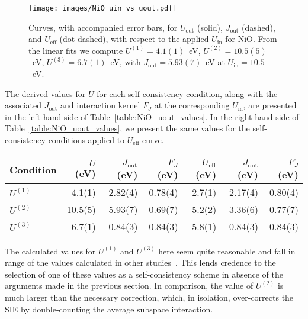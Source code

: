 %
\begin{figure}[th!]
\centering
\texttt{[image: images/NiO\_uin\_vs\_uout.pdf]}
\caption[Profiles of  $U_\textrm{out}$, $J_\textrm{out}$,  $U_\textrm{eff}$ vs $U_\textrm{in}$ for NiO]
{Curves, with accompanied error bars, 
for $U_\textrm{out}$ (solid), 
$J_\textrm{out}$ (dashed), 
and $U_\textrm{eff}$ (dot-dashed), 
with respect to the applied $U_\textrm{in}$ for NiO. 
%
From the linear fits we compute 
$U^{(1)}=4.1(1)$~eV, 
$U^{(2)}=10.5(5)$~eV, 
$U^{(3)}=6.7(1)$~eV, 
with $J_\textrm{out}=5.93(7)$~eV 
at $U_\textrm{in}=10.5$~eV.}
\label{fig:NiO_uin_vs_uout}
\end{figure}
%

%
The derived values for $U$ 
for each self-consistency condition, 
along with the associated $J_\textrm{out}$ 
and interaction kernel $F_J$ 
at the corresponding $U_\textrm{in}$, 
are presented in the left hand side of 
Table~\ref{table:NiO_uout_values}.
%
In the right hand side of Table~\ref{table:NiO_uout_values}, 
we present the same values for 
the self-consistency conditions 
applied to $U_\textrm{eff}$ curve.

\begin{table*}[th!]
\centering
\begin{tabular}{lrrr|rrr}
\hline\hline
Condition	&$U$ (eV)	&$J_\textrm{out}$ (eV)&$F_J$ (eV)&$U_\textrm{eff}$ (eV)&$J_\textrm{out}$ (eV)&$F_J$ (eV)\\	
\hline
$U^{(1)}$	&4.1(1)	&2.82(4)	&0.78(4)	&2.7(1)	&2.17(4)	&0.80(4)\\
$U^{(2)}$	&10.5(5)	&5.93(7)	&0.69(7)	&5.2(2)	&3.36(6)	&0.77(7)\\
$U^{(3)}$	&6.7(1)	&0.84(3)	&0.84(3)	&5.8(1)	&0.84(3)	&0.84(3)\\
\hline\hline
\end{tabular}
\caption[Summary of calculated $U$, $J$ and $F_J$ values for each self-consistency condition applied to NiO.]{
The values determined from $U_\textrm{out}$ (left) for each self-consistency scheme 
applied to NiO 
with the corresponding $J_\textrm{out}$ and interaction kernel $F_J$.
%
On the right hand side are the same conditions 
applied to the $U_\textrm{eff}$ curve.}
\label{table:NiO_uout_values}
\end{table*}

The calculated values for $U^{(1)}$ and $U^{(3)}$ 
here seem quite reasonable 
and fall in range of the values 
calculated in other studies~\cite{PhysRevB.44.943,PhysRevB.60.10763,PhysRevLett.102.226401,PhysRevB.62.16392,PhysRevB.71.035105}.
%
This lends credence to 
the selection of one of these values 
as a self-consistency scheme 
in absence of the arguments 
made in the previous section.
%
In comparison, 
the value of $U^{(2)}$ is much larger 
than the necessary correction, 
which, in isolation, over-corrects  
the SIE by double-counting 
the average subspace interaction.

